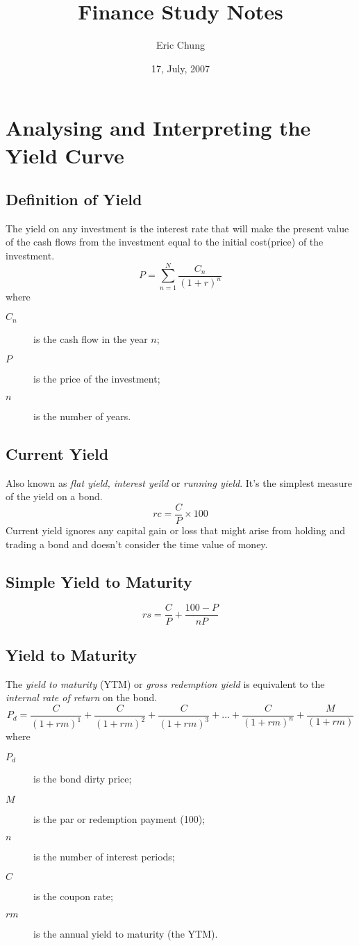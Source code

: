 \documentclass[8pt,a4paper]{article}
\begin{document}
\title{Finance Study Notes}
\author{Eric Chung}
\date{17, July, 2007}
\maketitle
\section{Analysing and Interpreting the Yield Curve}

\subsection{Definition of Yield}
The yield on any investment is the interest rate that will make the present value of the cash flows from the investment equal to the initial cost(price) of the investment.
\[P=\sum_{n=1}^N \frac{C_n}{(1+r)^n}\]
where
\begin{description}
	\item [$C_n$] is the cash flow in the year $n$;
	\item [$P$] is the price of the investment;
	\item [$n$] is the number of years.
\end{description}

\subsection{Current Yield}
Also known as \textit{flat yield, interest yeild} or \textit{running yield}. It's the simplest measure of the yield on a bond.
\[rc=\frac{C}{P}\times 100\]
Current yield ignores any capital gain or loss that might arise from holding and trading a bond and doesn't consider the time value of money.

\subsection{Simple Yield to Maturity}
\[rs=\frac{C}{P}+\frac{100 - P}{nP}\]

\subsection{Yield to Maturity}

The \textit{yield to maturity} (YTM) or \textit{gross redemption yield} is equivalent to the \textit{internal rate of return} on the bond.
\[P_d=
		\frac{C}{(1+rm)^1} +
		\frac{C}{(1+rm)^2} +		
		\frac{C}{(1+rm)^3} +...+
		\frac{C}{(1+rm)^n} +		
		\frac{M}{(1+rm)}		
\] 
where
\begin{description}
	\item[$P_d$] is the bond dirty price;
	\item[$M$] is the par or redemption payment (100);
	\item[$n$] is the number of interest periods;
	\item[$C$] is the coupon rate;
	\item[$rm$] is the annual yield to maturity (the YTM).
\end{description}
\end{document}
